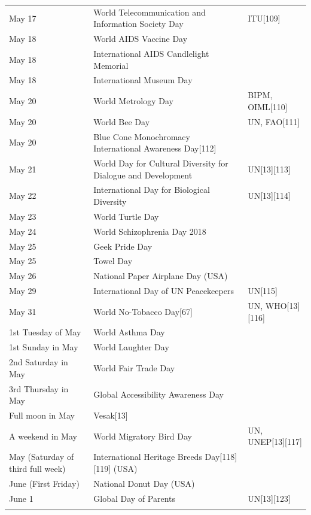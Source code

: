 \documentclass[
  openany]{book}
\begin{document}
\begin{longtable}[t]{>{\raggedright\arraybackslash}p{8em}>{\raggedright\arraybackslash}p{20em}>{\raggedright\arraybackslash}p{12em}}
\rowcolor{gray!6}  May 17 & World Telecommunication and Information Society Day & ITU[109]\\
May 18 & World AIDS Vaccine Day & \\
\rowcolor{gray!6}  May 18 & International AIDS Candlelight Memorial & \\
May 18 & International Museum Day & \\
\rowcolor{gray!6}  May 20 & World Metrology Day & BIPM, OIML[110]\\
\addlinespace
May 20 & World Bee Day & UN, FAO[111]\\
\rowcolor{gray!6}  May 20 & Blue Cone Monochromacy International Awareness Day[112] & \\
May 21 & World Day for Cultural Diversity for Dialogue and Development & UN[13][113]\\
\rowcolor{gray!6}  May 22 & International Day for Biological Diversity & UN[13][114]\\
May 23 & World Turtle Day & \\
\addlinespace
\rowcolor{gray!6}  May 24 & World Schizophrenia Day 2018 & \\
May 25 & Geek Pride Day & \\
\rowcolor{gray!6}  May 25 & Towel Day & \\
May 26 & National Paper Airplane Day (USA) & \\
\rowcolor{gray!6}  May 29 & International Day of UN Peacekeepers & UN[115]\\
\addlinespace
May 31 & World No-Tobacco Day[67] & UN, WHO[13][116]\\
\rowcolor{gray!6}  1st Tuesday of May & World Asthma Day & \\
1st Sunday in May & World Laughter Day & \\
\rowcolor{gray!6}  2nd Saturday in May & World Fair Trade Day & \\
3rd Thursday in May & Global Accessibility Awareness Day & \\
\addlinespace
\rowcolor{gray!6}  Full moon in May & Vesak[13] & \\
A weekend in May & World Migratory Bird Day & UN, UNEP[13][117]\\
\rowcolor{gray!6}  May (Saturday of third full week) & International Heritage Breeds Day[118][119] (USA) & \\
June (First Friday) & National Donut Day (USA) & \\
\rowcolor{gray!6}  June 1 & Global Day of Parents & UN[13][123]\\
\addlinespace

\end{longtable}
\end{document}
